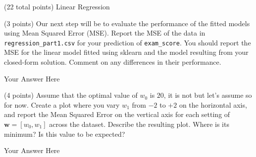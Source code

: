 \documentclass[12pt]{article}
\begin{document}
\begin{question}{(22 total points) Linear Regression}
 
%
%
\begin{subquestion}{(3 points) Our next step will be to evaluate the performance of the fitted models using Mean Squared Error (MSE). 
Report the MSE of the data in \texttt{regression\_part1.csv} for your prediction of \texttt{exam\_score}.
You should report the MSE for the linear model fitted using sklearn and the model resulting from your closed-form solution. 
Comment on any differences in their performance. 
}


\begin{answerbox}{10em}
Your Answer Here
\end{answerbox}



\end{subquestion}




%
%
\begin{subquestion}{(4 points) Assume that the optimal value of $w_0$ is $20$, it is not but let's assume so for now. 
Create a plot where you vary $w_1$ from $-2$ to $+2$ on the horizontal axis, and report the Mean Squared Error on the vertical axis for each setting of $\mathbf{w} = [w_0, w_1]$ across the dataset. 
Describe the resulting plot. Where is its minimum? Is this value to be expected?\\ 
}


\begin{answerbox}{35em}
Your Answer Here
\end{answerbox}



\end{subquestion}


 
\end{question}





\clearpage
\end{document}
